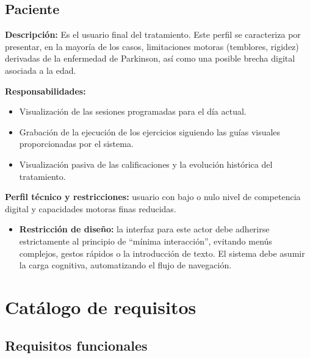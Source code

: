 \subsection{Paciente}
\textbf{Descripción:} Es el usuario final del tratamiento. Este perfil se caracteriza por presentar, en la mayoría de los casos, limitaciones motoras (temblores, rigidez) derivadas de la enfermedad de Parkinson, así como una posible brecha digital asociada a la edad.

\textbf{Responsabilidades:}
\begin{itemize}
    \item Visualización de las sesiones programadas para el día actual.
    \item Grabación de la ejecución de los ejercicios siguiendo las guías visuales proporcionadas por el sistema.
    \item Visualización pasiva de las calificaciones y la evolución histórica del tratamiento.
\end{itemize}

\textbf{Perfil técnico y restricciones:} usuario con bajo o nulo nivel de competencia digital y capacidades motoras finas reducidas.
\begin{itemize}
    \item \textbf{Restricción de diseño:} la interfaz para este actor debe adherirse estrictamente al principio de ``mínima interacción'', evitando menús complejos, gestos rápidos o la introducción de texto. El sistema debe asumir la carga cognitiva, automatizando el flujo de navegación.
\end{itemize}

\section{Catálogo de requisitos}

\subsection{Requisitos funcionales}

